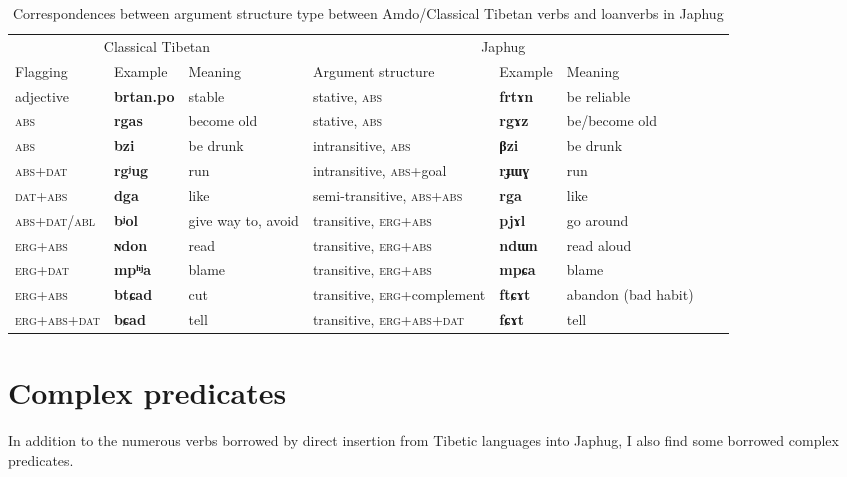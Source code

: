 \documentclass[oneside,a4paper,11pt]{article}
\newcommand{\ipa}[1]{{\phon\textbf{\mbox{#1}}}} %
\begin{document}
\begin{landscape}

 

\begin{table}[H]
\caption{Correspondences between argument structure type between Amdo/Classical Tibetan verbs and loanverbs in Japhug} \label{ex:correspondences}
\begin{tabular}{llllllll}
\toprule
 \multicolumn{3}{c}{Classical Tibetan}  & \multicolumn{3}{c}{Japhug}&&\\
Flagging & Example & Meaning & Argument structure & Example & Meaning & \\
\midrule
adjective & \ipa{brtan.po} &stable&  stative, \textsc{abs} & \ipa{frtɤn} &be reliable& \\
 \textsc{abs} &  \ipa{rgas} & become old &stative, \textsc{abs} & \ipa{rgɤz} & be/become old \\
 \textsc{abs} &  \ipa{bzi} & be drunk &intransitive, \textsc{abs} & \ipa{βzi} & be drunk \\
 \textsc{abs+dat} &  \ipa{rgʲug} &run &intransitive, \textsc{abs}+goal  & \ipa{rɟɯɣ} & run \\
\textsc{dat+abs} & \ipa{dga} & like & semi-transitive, \textsc{abs+abs}& \ipa{rga} & like \\
\midrule
 \textsc{abs+dat/abl} &  \ipa{bʲol} & give way to, avoid &transitive, \textsc{erg+abs}& \ipa{pjɤl} & go around \\
\textsc{erg+abs} & \ipa{ɴdon} & read & transitive, \textsc{erg+abs} & \ipa{ndɯn} & read aloud \\

\textsc{erg+dat} & \ipa{mpʰʲa} & blame & transitive, \textsc{erg+abs}& \ipa{mpɕa} & blame \\
\textsc{erg+abs} & \ipa{btɕad} & cut & transitive, \textsc{erg+}complement & \ipa{ftɕɤt} & abandon (bad habit) \\
\bottomrule
\textsc{erg+abs+dat} & \ipa{bɕad} & tell & transitive, \textsc{erg+abs+dat}& \ipa{fɕɤt} & tell \\
\bottomrule
\end{tabular}%
\end{table}  
\end{landscape}

  \section{Complex predicates}  
In addition to the numerous verbs borrowed by direct insertion from Tibetic languages into Japhug, I also find some borrowed complex predicates.
\end{document}
